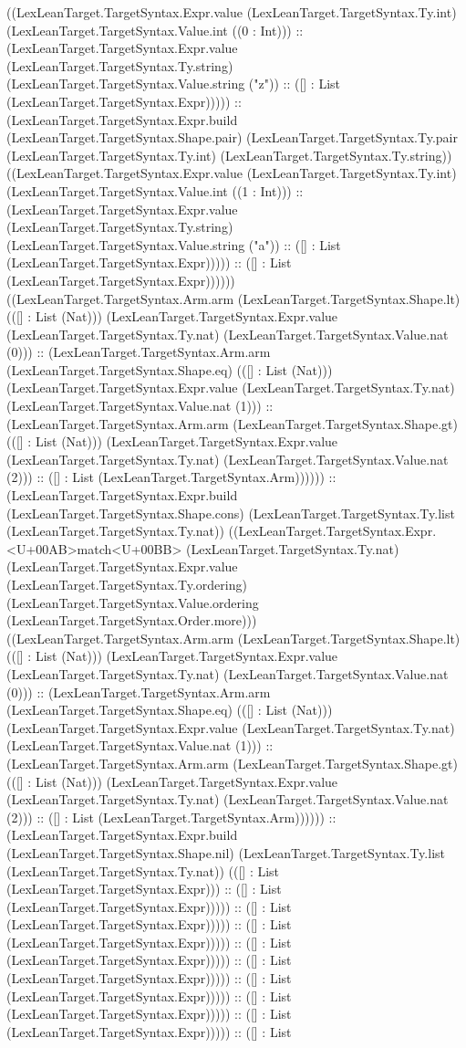 \documentclass[11pt]{article}
\begin{document}
((LexLeanTarget.TargetSyntax.Expr.value (LexLeanTarget.TargetSyntax.Ty.int) (LexLeanTarget.TargetSyntax.Value.int ((0 : Int))) :: (LexLeanTarget.TargetSyntax.Expr.value (LexLeanTarget.TargetSyntax.Ty.string) (LexLeanTarget.TargetSyntax.Value.string ("z")) :: ([] : List (LexLeanTarget.TargetSyntax.Expr))))) :: (LexLeanTarget.TargetSyntax.Expr.build (LexLeanTarget.TargetSyntax.Shape.pair) (LexLeanTarget.TargetSyntax.Ty.pair (LexLeanTarget.TargetSyntax.Ty.int) (LexLeanTarget.TargetSyntax.Ty.string)) ((LexLeanTarget.TargetSyntax.Expr.value (LexLeanTarget.TargetSyntax.Ty.int) (LexLeanTarget.TargetSyntax.Value.int ((1 : Int))) :: (LexLeanTarget.TargetSyntax.Expr.value (LexLeanTarget.TargetSyntax.Ty.string) (LexLeanTarget.TargetSyntax.Value.string ("a")) :: ([] : List (LexLeanTarget.TargetSyntax.Expr))))) :: ([] : List (LexLeanTarget.TargetSyntax.Expr)))))) ((LexLeanTarget.TargetSyntax.Arm.arm (LexLeanTarget.TargetSyntax.Shape.lt) (([] : List (Nat))) (LexLeanTarget.TargetSyntax.Expr.value (LexLeanTarget.TargetSyntax.Ty.nat) (LexLeanTarget.TargetSyntax.Value.nat (0))) :: (LexLeanTarget.TargetSyntax.Arm.arm (LexLeanTarget.TargetSyntax.Shape.eq) (([] : List (Nat))) (LexLeanTarget.TargetSyntax.Expr.value (LexLeanTarget.TargetSyntax.Ty.nat) (LexLeanTarget.TargetSyntax.Value.nat (1))) :: (LexLeanTarget.TargetSyntax.Arm.arm (LexLeanTarget.TargetSyntax.Shape.gt) (([] : List (Nat))) (LexLeanTarget.TargetSyntax.Expr.value (LexLeanTarget.TargetSyntax.Ty.nat) (LexLeanTarget.TargetSyntax.Value.nat (2))) :: ([] : List (LexLeanTarget.TargetSyntax.Arm)))))) :: (LexLeanTarget.TargetSyntax.Expr.build (LexLeanTarget.TargetSyntax.Shape.cons) (LexLeanTarget.TargetSyntax.Ty.list (LexLeanTarget.TargetSyntax.Ty.nat)) ((LexLeanTarget.TargetSyntax.Expr.<U+00AB>match<U+00BB> (LexLeanTarget.TargetSyntax.Ty.nat) (LexLeanTarget.TargetSyntax.Expr.value (LexLeanTarget.TargetSyntax.Ty.ordering) (LexLeanTarget.TargetSyntax.Value.ordering (LexLeanTarget.TargetSyntax.Order.more))) ((LexLeanTarget.TargetSyntax.Arm.arm (LexLeanTarget.TargetSyntax.Shape.lt) (([] : List (Nat))) (LexLeanTarget.TargetSyntax.Expr.value (LexLeanTarget.TargetSyntax.Ty.nat) (LexLeanTarget.TargetSyntax.Value.nat (0))) :: (LexLeanTarget.TargetSyntax.Arm.arm (LexLeanTarget.TargetSyntax.Shape.eq) (([] : List (Nat))) (LexLeanTarget.TargetSyntax.Expr.value (LexLeanTarget.TargetSyntax.Ty.nat) (LexLeanTarget.TargetSyntax.Value.nat (1))) :: (LexLeanTarget.TargetSyntax.Arm.arm (LexLeanTarget.TargetSyntax.Shape.gt) (([] : List (Nat))) (LexLeanTarget.TargetSyntax.Expr.value (LexLeanTarget.TargetSyntax.Ty.nat) (LexLeanTarget.TargetSyntax.Value.nat (2))) :: ([] : List (LexLeanTarget.TargetSyntax.Arm)))))) :: (LexLeanTarget.TargetSyntax.Expr.build (LexLeanTarget.TargetSyntax.Shape.nil) (LexLeanTarget.TargetSyntax.Ty.list (LexLeanTarget.TargetSyntax.Ty.nat)) (([] : List (LexLeanTarget.TargetSyntax.Expr))) :: ([] : List (LexLeanTarget.TargetSyntax.Expr))))) :: ([] : List (LexLeanTarget.TargetSyntax.Expr))))) :: ([] : List (LexLeanTarget.TargetSyntax.Expr))))) :: ([] : List (LexLeanTarget.TargetSyntax.Expr))))) :: ([] : List (LexLeanTarget.TargetSyntax.Expr))))) :: ([] : List (LexLeanTarget.TargetSyntax.Expr))))) :: ([] : List (LexLeanTarget.TargetSyntax.Expr))))) :: ([] : List (LexLeanTarget.TargetSyntax.Expr))))) :: ([] : List 
\end{document}
